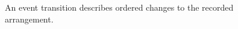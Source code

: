 \begin{figure}[H]
\centering
{}
\caption{An event transition describes ordered changes to the recorded arrangement.}\label{fig:teach-P-03-product-04}
\end{figure}
